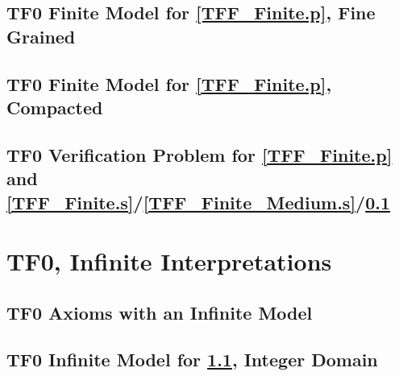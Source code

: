 \documentclass{easychair}
\begin{document}
\newpage
\subsection{TF0 Finite Model for \ref{TFF_Finite.p}, Fine Grained}
\label{TFF_Finite_Fine.s}
\begin{small}

\end{small}

\newpage
\subsection{TF0 Finite Model for \ref{TFF_Finite.p}, Compacted}
\label{TFF_Finite_Compact.s}
\begin{small}

\end{small}

\newpage
\subsection{TF0 Verification Problem for \ref{TFF_Finite.p} and 
            \ref{TFF_Finite.s}/\ref{TFF_Finite_Medium.s}/\ref{TFF_Finite_Fine.s}}
\label{TFF_Finite.s.p}
\begin{small}

\end{small}

\newpage
\section{TF0, Infinite Interpretations}
\label{TF0Infinite}

\subsection{TF0 Axioms with an Infinite Model}
\label{TFF_Infinite.p}
\begin{small}

\end{small}

\newpage
\subsection{TF0 Infinite Model for \ref{TFF_Infinite.p}, Integer Domain}
\label{TFF_Integer.s}
\begin{small}

\end{small}
\end{document}
